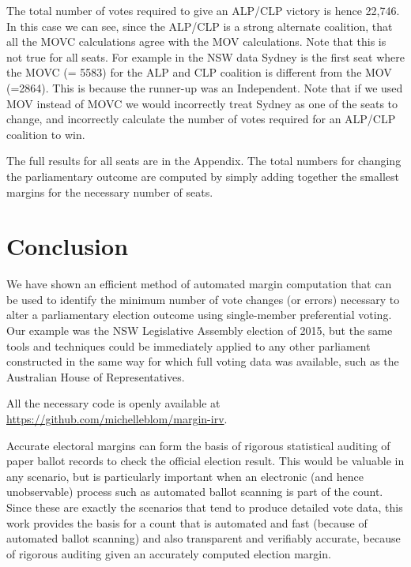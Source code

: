 \documentclass{article}
\begin{document}
The total number of votes required to give an ALP/CLP victory is hence 22,746.
In this case we can see, since the ALP/CLP is a strong alternate coalition, that all the MOVC calculations agree with the MOV calculations. 
Note that this is not true for all seats. 
For example in the NSW data Sydney is the first seat where the MOVC (= 5583) for the ALP and CLP coalition is different from the MOV (=2864).  This is because the runner-up was an Independent.
Note that if we used MOV instead of MOVC we would incorrectly treat Sydney as one of the seats to change, and incorrectly calculate the number of votes required for an ALP/CLP coalition to win.

The full results for all seats are in the Appendix.  The total numbers for changing the parliamentary outcome are computed by simply adding together the smallest margins for  the necessary number of seats.


\section{Conclusion} \vspace{-0.2cm}
We have shown an efficient method of automated margin computation that can be used to identify the minimum number of vote changes (or errors) necessary to alter a parliamentary election outcome using single-member preferential voting.
Our example was the NSW Legislative Assembly election of 2015, but the same tools and techniques could be immediately applied to any other parliament constructed in the same way for which full voting data was available, such as the Australian House of Representatives.

All the necessary code is openly available at \url{https://github.com/michelleblom/margin-irv}.

Accurate electoral margins can form the basis of rigorous statistical auditing of paper ballot records to check the official election result.  This would be valuable in any scenario, but is particularly important when an electronic (and hence unobservable) process such as automated ballot scanning is part of the count.  Since these are exactly the scenarios that tend to produce detailed vote data, this work provides the basis for a count that is automated and fast (because of automated ballot scanning) and also transparent and verifiably accurate, because of rigorous auditing given an accurately computed election margin.

%


\end{document}
